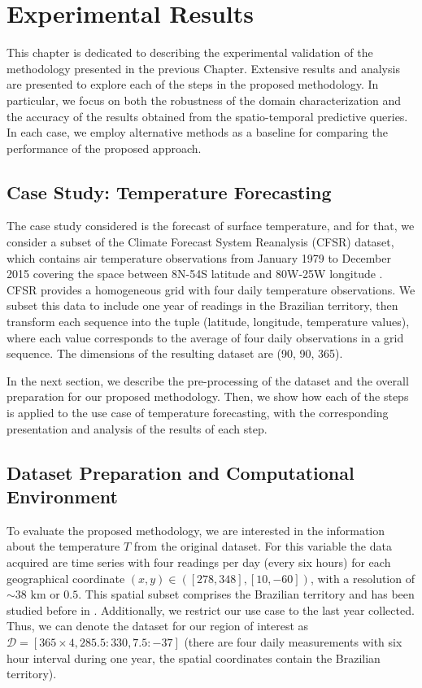 \chapter{Experimental Results}
\label{chapter_Experimental_Results}

This chapter is dedicated to describing the experimental validation of the methodology presented in the previous Chapter. Extensive results and analysis are presented to explore each of the steps in the proposed methodology. In particular, we focus on both the robustness of the domain characterization and the accuracy of the results obtained from the spatio-temporal predictive queries. In each case, we employ alternative methods as a baseline for comparing the performance of the proposed approach.

\section{Case Study: Temperature Forecasting}

The case study considered is the forecast of surface temperature, and for that, we consider a subset of the Climate Forecast System Reanalysis (CFSR) dataset, which contains air temperature observations from January 1979 to December 2015 covering the space between 8N-54S latitude and 80W-25W longitude \cite{Saha2010}. CFSR provides a homogeneous grid with four daily temperature observations. We subset this data to include one year of readings in the Brazilian territory, then transform each sequence into the tuple (latitude, longitude, temperature values), where each value corresponds to the average of four daily observations in a grid sequence. The dimensions of the resulting dataset are (90, 90, 365).

In the next section, we describe the pre-processing of the dataset and the overall preparation for our proposed methodology. Then, we show how each of the steps is applied to the use case of temperature forecasting, with the corresponding presentation and analysis of the results of each step.

\section{Dataset Preparation and Computational Environment}
\label{sec:DatasetPreparation}

To evaluate the proposed methodology, we are interested in the information about the temperature $T$ from the original dataset. For this variable the data acquired are time series with four readings per day (every six hours) for each geographical coordinate $(x,y)\in ([278, 348], [10,-60])$, with a resolution of $\sim 38$ km or $0.5$\textdegree. This spatial subset comprises the Brazilian territory and has been studied before in \cite{Souto2018}. Additionally, we restrict our use case to the last year collected. Thus, we can denote the dataset for our region of interest as $\mathcal{D} = [ 365\times 4, 285.5:330, 7.5:-37]$ (there are four daily measurements with six hour interval during one year, the spatial coordinates contain the Brazilian territory). 

